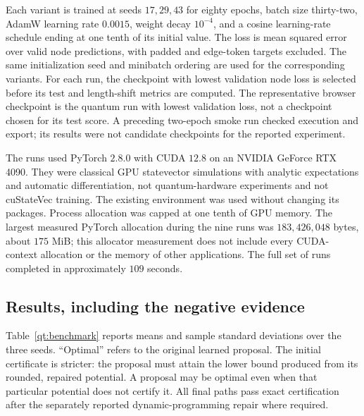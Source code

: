 Each variant is trained at seeds $17,29,43$ for eighty epochs, batch size
thirty-two, AdamW learning rate $0.0015$, weight decay $10^{-4}$, and a
cosine learning-rate schedule ending at one tenth of its initial value.
The loss is mean squared error over valid node predictions, with padded
and edge-token targets excluded. The same initialization seed and
minibatch ordering are used for the corresponding variants. For each run,
the checkpoint with lowest validation node loss is selected before its
test and length-shift metrics are computed. The representative browser
checkpoint is the quantum run with lowest validation loss, not a
checkpoint chosen for its test score. A preceding two-epoch smoke run
checked execution and export; its results were not candidate checkpoints
for the reported experiment.

The runs used PyTorch $2.8.0$ with CUDA $12.8$ on an NVIDIA GeForce RTX
4090. They were classical GPU statevector simulations with analytic
expectations and automatic differentiation, not quantum-hardware
experiments and not cuStateVec training. The existing environment was
used without changing its packages. Process allocation was capped at
one tenth of GPU memory. The largest measured PyTorch allocation during
the nine runs was $183{,}426{,}048$ bytes, about $175$ MiB; this allocator
measurement does not include every CUDA-context allocation or the memory
of other applications. The full set of runs completed in approximately
$109$ seconds.\cite{qtExperiment}

\subsection{Results, including the negative evidence}

Table~\ref{qt:benchmark} reports means and sample standard deviations over
the three seeds. ``Optimal'' refers to the original learned proposal.
The initial certificate is stricter: the proposal must attain the lower
bound produced from its rounded, repaired potential. A proposal may be
optimal even when that particular potential does not certify it.
All final paths pass exact certification after the separately reported
dynamic-programming repair where required.

